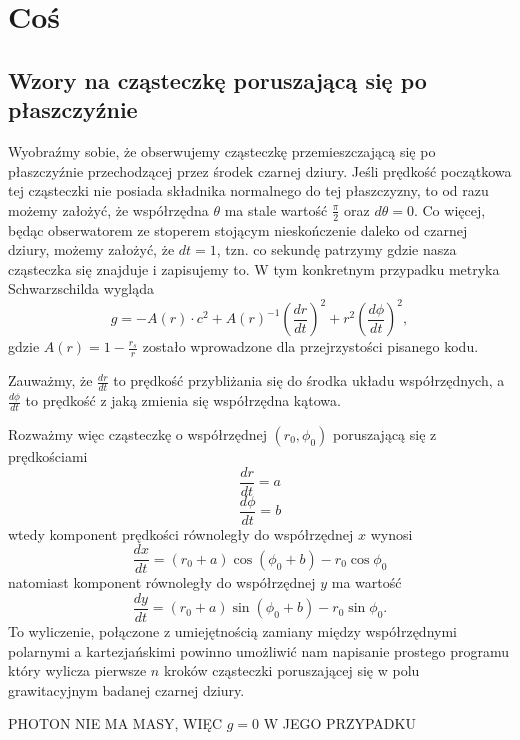 \section{Coś}

\subsection{Wzory na cząsteczkę poruszającą się po płaszczyźnie}

Wyobraźmy sobie, że obserwujemy cząsteczkę przemieszczającą się po płaszczyźnie przechodzącej przez środek czarnej dziury. Jeśli prędkość początkowa tej cząsteczki nie posiada składnika normalnego do tej płaszczyzny, to od razu możemy założyć, że współrzędna $\theta$ ma stale wartość $\frac{\pi}{2}$ oraz $d\theta=0$. Co więcej, będąc obserwatorem ze stoperem stojącym nieskończenie daleko od czarnej dziury, możemy założyć, że $dt=1$, tzn. co sekundę patrzymy gdzie nasza cząsteczka się znajduje i zapisujemy to. W tym konkretnym przypadku metryka Schwarzschilda wygląda
$$g=-A(r)\cdot c^2+ A(r)^{-1}\left(\frac{dr}{dt}\right)^2+r^2\left(\frac{d\phi}{dt}\right)^2,$$
gdzie $A(r)=1-\frac{r_s}{r}$ zostało wprowadzone dla przejrzystości pisanego kodu.

Zauważmy, że $\frac{dr}{dt}$ to prędkość przybliżania się do środka układu współrzędnych, a $\frac{d\phi}{dt}$ to prędkość z jaką zmienia się współrzędna kątowa. 

Rozważmy więc cząsteczkę o współrzędnej $(r_0, \phi_0)$ poruszającą się z prędkościami
$$\frac{dr}{dt}=a$$
$$\frac{d\phi}{dt}=b$$
wtedy komponent prędkości równoległy do współrzędnej $x$ wynosi
$$\frac{dx}{dt}=(r_0+a)\cos(\phi_0+b)-r_0\cos\phi_0$$
natomiast komponent równoległy do współrzędnej $y$ ma wartość
$$\frac{dy}{dt}=(r_0+a)\sin(\phi_0+b)-r_0\sin\phi_0.$$
To wyliczenie, połączone z umiejętnością zamiany między współrzędnymi polarnymi a kartezjańskimi powinno umożliwić nam napisanie prostego programu który wylicza pierwsze $n$ kroków cząsteczki poruszającej się w polu grawitacyjnym badanej czarnej dziury.

PHOTON NIE MA MASY, WIĘC $g=0$ W JEGO PRZYPADKU
